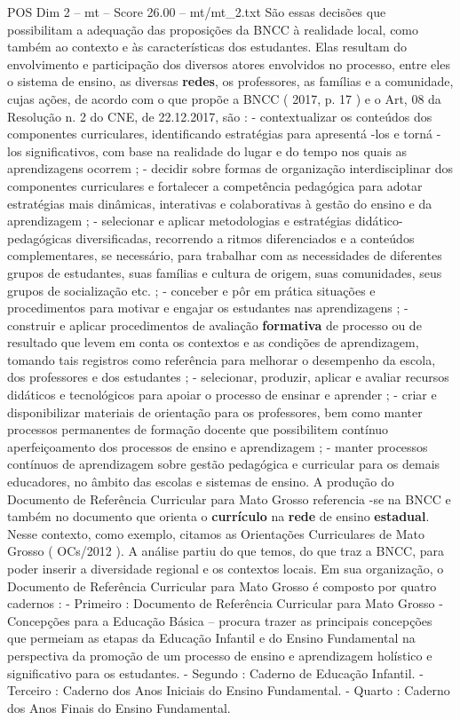\begin{textsample}{POS Dim 2 – mt – Score 26.00 – mt/mt\_2.txt}
São essas decisões que possibilitam a adequação das proposições da BNCC à realidade local, como também ao contexto e às características dos estudantes.
Elas resultam do envolvimento e participação dos diversos atores envolvidos no processo, entre eles o sistema de ensino, as diversas \textbf{redes}, os professores, as famílias e a comunidade, cujas ações, de acordo com o que propõe a BNCC ( 2017, p. 17 ) e o Art, 08 da Resolução n. 2 do CNE, de 22.12.2017, são : - contextualizar os conteúdos dos componentes curriculares, identificando estratégias para apresentá -los e torná -los significativos, com base na realidade do lugar e do tempo nos quais as aprendizagens ocorrem ; - decidir sobre formas de organização interdisciplinar dos componentes curriculares e fortalecer a competência pedagógica para adotar estratégias mais dinâmicas, interativas e colaborativas à gestão do ensino e da aprendizagem ; - selecionar e aplicar metodologias e estratégias didático-pedagógicas diversificadas, recorrendo a ritmos diferenciados e a conteúdos complementares, se necessário, para trabalhar com as necessidades de diferentes grupos de estudantes, suas famílias e cultura de origem, suas comunidades, seus grupos de socialização etc. ; - conceber e pôr em prática situações e procedimentos para motivar e engajar os estudantes nas aprendizagens ; - construir e aplicar procedimentos de avaliação \textbf{formativa} de processo ou de resultado que levem em conta os contextos e as condições de aprendizagem, tomando tais registros como referência para melhorar o desempenho da escola, dos professores e dos estudantes ; - selecionar, produzir, aplicar e avaliar recursos didáticos e tecnológicos para apoiar o processo de ensinar e aprender ; - criar e disponibilizar materiais de orientação para os professores, bem como manter processos permanentes de formação docente que possibilitem contínuo aperfeiçoamento dos processos de ensino e aprendizagem ; - manter processos contínuos de aprendizagem sobre gestão pedagógica e curricular para os demais educadores, no âmbito das escolas e sistemas de ensino.
A produção do Documento de Referência Curricular para Mato Grosso referencia -se na BNCC e também no documento que orienta o \textbf{currículo} na \textbf{rede} de ensino \textbf{estadual}.
Nesse contexto, como exemplo, citamos as Orientações Curriculares de Mato Grosso ( OCs/2012 ).
A análise partiu do que temos, do que traz a BNCC, para poder inserir a diversidade regional e os contextos locais.
Em sua organização, o Documento de Referência Curricular para Mato Grosso é composto por quatro cadernos : - Primeiro : Documento de Referência Curricular para Mato Grosso - Concepções para a Educação Básica – procura trazer as principais concepções que permeiam as etapas da Educação Infantil e do Ensino Fundamental na perspectiva da promoção de um processo de ensino e aprendizagem holístico e significativo para os estudantes. - Segundo : Caderno de Educação Infantil. - Terceiro : Caderno dos Anos Iniciais do Ensino Fundamental. - Quarto : Caderno dos Anos Finais do Ensino Fundamental.

\end{textsample}
